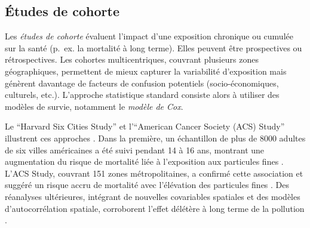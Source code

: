 \subsection{Études de cohorte}
Les \emph{études de cohorte} \citep{BellSametDominici2004} évaluent l’impact d’une exposition chronique ou cumulée sur la santé (p.~ex. la mortalité à long terme). Elles peuvent être prospectives ou rétrospectives. Les cohortes multicentriques, couvrant plusieurs zones géographiques, permettent de mieux capturer la variabilité d’exposition mais génèrent davantage de facteurs de confusion potentiels (socio-économiques, culturels, etc.). L’approche statistique standard consiste alors à utiliser des modèles de survie, notamment le \emph{modèle de Cox}.

Le ``Harvard Six Cities Study'' et l’``American Cancer Society (ACS) Study'' illustrent ces approches \citep{DockeryPopeXu1993,PopeThunNamboodiri1995,Pope2007}. Dans la première, un échantillon de plus de 8000 adultes de six villes américaines a été suivi pendant 14 à 16 ans, montrant une augmentation du risque de mortalité liée à l’exposition aux particules fines \citep{DockeryPopeXu1993}. L’ACS Study, couvrant 151 zones métropolitaines, a confirmé cette association et suggéré un risque accru de mortalité avec l’élévation des particules fines \citep{PopeThunNamboodiri1995}. Des réanalyses ultérieures, intégrant de nouvelles covariables spatiales et des modèles d’autocorrélation spatiale, corroborent l’effet délétère à long terme de la pollution \citep{LadenSchwartzSpeizerDockery2006,KrewskiJerrettPope2009,Pope2007}.



